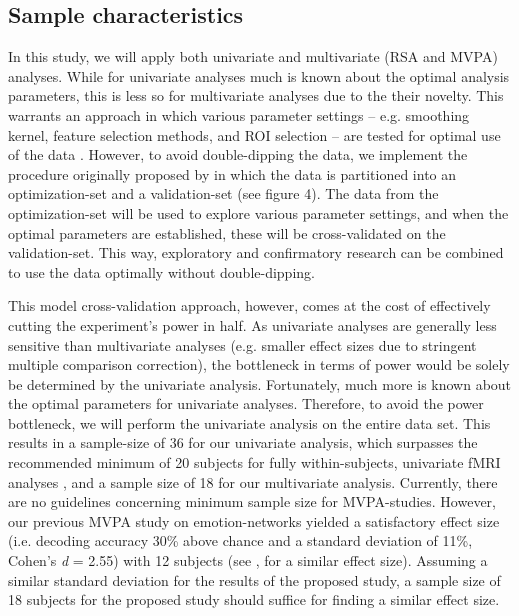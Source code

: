\documentclass[12pt,a4paper]{article}\usepackage[]{graphicx}\usepackage[]{color}
\begin{document}
\subsection{Sample characteristics}
In this study, we will apply both univariate and multivariate (RSA and MVPA) analyses. While for univariate analyses much is known about the optimal analysis parameters, this is less so for multivariate analyses due to the their novelty. This warrants an approach in which various parameter settings -- e.g. smoothing kernel, feature selection methods, and ROI selection -- are tested for optimal use of the data \citep{kragel2012}. However, to avoid double-dipping the data, we implement the procedure originally proposed by \cite{kriegeskorte2009} in which the data is partitioned into an optimization-set and a validation-set (see figure 4). The data from the optimization-set will be used to explore various parameter settings, and when the optimal parameters are established, these will be cross-validated on the validation-set. This way, exploratory and confirmatory research can be combined to use the data optimally without double-dipping. 

This model cross-validation approach, however, comes at the cost of effectively cutting the experiment's power in half. As univariate analyses are generally less sensitive than multivariate analyses (e.g. smaller effect sizes due to stringent multiple comparison correction), the bottleneck in terms of power would be solely be determined by the univariate analysis. Fortunately, much more is known about the optimal parameters for univariate analyses. Therefore, to avoid the power bottleneck, we will perform the univariate analysis on the entire data set. This results in a sample-size of 36 for our univariate analysis, which surpasses the recommended minimum of 20 subjects for fully within-subjects, univariate fMRI analyses \citep{desmond2002}, and a sample size of 18 for our multivariate analysis. Currently, there are no guidelines concerning minimum sample size for MVPA-studies. However, our previous MVPA study on emotion-networks \citep{oosterwijk2015} yielded a satisfactory effect size (i.e. decoding accuracy 30\% above chance and a standard deviation of 11\%, Cohen's \emph{d} = 2.55) with 12 subjects (see \citealp{baucom2012}, for a similar effect size). Assuming a similar standard deviation for the results of the proposed study, a sample size of 18 subjects for the proposed study should suffice for finding a similar effect size.
\end{document}
